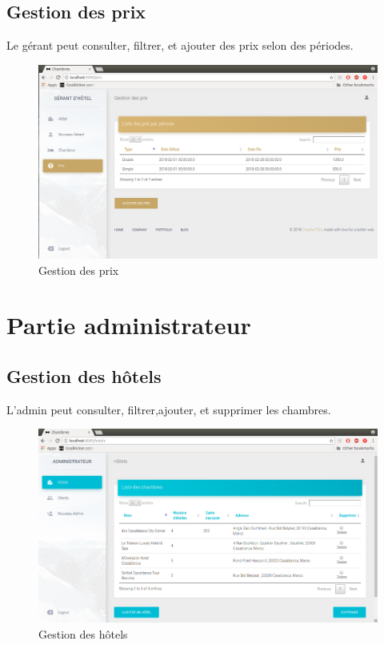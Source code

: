 \documentclass[12pt,a4paper]{report}
\begin{document}
	\subsection{Gestion des prix}
Le gérant peut consulter, filtrer, et ajouter des prix selon des périodes.
	\begin{figure}[!hbtp]
		\centering
		\includegraphics[scale=0.3]{./graphics/prix.png}
		\caption{Gestion des prix}
		\end{figure}
		\newpage

	\section{Partie administrateur}
	\subsection{Gestion des hôtels}
L'admin peut consulter, filtrer,ajouter, et supprimer les chambres.
	\begin{figure}[!hbtp]
		\centering
		\includegraphics[scale=0.3]{./graphics/hotels.png}
		\caption{Gestion des hôtels}
		\end{figure}
		\newpage
\end{document}

